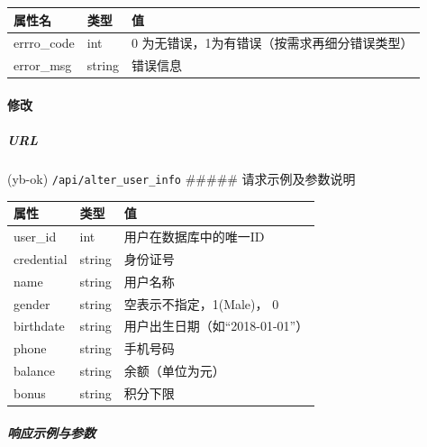 \documentclass[]{article}
\let\oldparagraph\paragraph
\renewcommand{\paragraph}[1]{\oldparagraph{#1}\mbox{}}
\let\oldsubparagraph\subparagraph
\renewcommand{\subparagraph}[1]{\oldsubparagraph{#1}\mbox{}}
\begin{document}
\begin{longtable}[]{@{}lll@{}}
\toprule
属性名 & 类型 & 值\tabularnewline
\midrule
\endhead
errro\_code & int & 0
为无错误，1为有错误（按需求再细分错误类型）\tabularnewline
error\_msg & string & 错误信息\tabularnewline
\bottomrule
\end{longtable}

\hypertarget{ux4feeux6539}{%
\paragraph{修改}\label{ux4feeux6539}}

\hypertarget{url-10}{%
\subparagraph{URL}\label{url-10}}

(yb-ok) \texttt{/api/alter\_user\_info} \#\#\#\#\# 请求示例及参数说明

\begin{Shaded}
\begin{Highlighting}[]
\FunctionTok{\{}
    \FunctionTok{:} \FunctionTok{,}
    \FunctionTok{:}\FunctionTok{,}
    \FunctionTok{:}\FunctionTok{,}
    \ErrorTok{//} 
\FunctionTok{\}}
\end{Highlighting}
\end{Shaded}

\begin{longtable}[]{@{}lll@{}}
\toprule
属性 & 类型 & 值\tabularnewline
\midrule
\endhead
user\_id & int & 用户在数据库中的唯一ID\tabularnewline
credential & string & 身份证号\tabularnewline
name & string & 用户名称\tabularnewline
gender & string & 空表示不指定，1(Male)， 0\tabularnewline
birthdate & string & 用户出生日期（如``2018-01-01''）\tabularnewline
phone & string & 手机号码\tabularnewline
balance & string & 余额（单位为元）\tabularnewline
bonus & string & 积分下限\tabularnewline
\bottomrule
\end{longtable}

\hypertarget{ux54cdux5e94ux793aux4f8bux4e0eux53c2ux6570-5}{%
\subparagraph{响应示例与参数}\label{ux54cdux5e94ux793aux4f8bux4e0eux53c2ux6570-5}}

\begin{Shaded}
\begin{Highlighting}[]
\FunctionTok{\{}
    \FunctionTok{:}\FunctionTok{,}
    \FunctionTok{:}
\FunctionTok{\}}
\end{Highlighting}
\end{Shaded}
\end{document}
